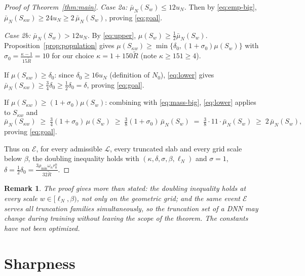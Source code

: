 \documentclass[11pt]{article}
\newtheorem{remark}[theorem]{Remark}
\newcommand{\emp}{\bar\mu_N}
\begin{document}
\begin{proof}[Proof of Theorem~\ref{thm:main}]
\emph{Case 2a: $\emp(S_w)\le12u_N$.}  Then by \eqref{eq:emp-big},
$\emp(S_{\kappa w})\ge24u_N\ge2\,\emp(S_w)$, proving \eqref{eq:goal}.

\emph{Case 2b: $\emp(S_w)>12u_N$.}  By \eqref{eq:upper},
$\mu(S_w)\ge\frac12\emp(S_w)$.  Proposition~\ref{prop:population} gives
$\mu(S_{\kappa w})\ge\min\{\delta_0,(1+\sigma_0)\mu(S_w)\}$ with
$\sigma_0=\frac{\kappa-1}{15\widetilde R}=10$ for our choice
$\kappa=1+150\widetilde R$ (note $\kappa\ge151\ge4$).

If $\mu(S_{\kappa w})\ge\delta_0$: since $\delta_0\ge16u_N$ (definition of $N_0$),
\eqref{eq:lower} gives
$\emp(S_{\kappa w})\ge\frac34\delta_0\ge\frac12\delta_0=\delta$, proving
\eqref{eq:goal}.

If $\mu(S_{\kappa w})\ge(1+\sigma_0)\mu(S_w)$: combining with
\eqref{eq:mass-big}, \eqref{eq:lower} applies to $S_{\kappa w}$ and
\[
\emp(S_{\kappa w})\;\ge\;\tfrac34(1+\sigma_0)\,\mu(S_w)
\;\ge\;\tfrac38(1+\sigma_0)\,\emp(S_w)
\;=\;\tfrac38\cdot11\cdot\emp(S_w)\;\ge\;2\,\emp(S_w),
\]
proving \eqref{eq:goal}.

Thus on $\mathcal E$, for every admissible $\mathcal L$, every truncated slab and
every grid scale below $\beta$, the doubling inequality holds with
$(\kappa,\delta,\sigma,\beta,\ell_N)$ and $\sigma=1$,
$\delta=\frac12\delta_0=\frac{3\rho_{\min}\omega_nr_0^n}{32\widetilde R}$.
\end{proof}

\begin{remark}
The proof gives more than stated: the doubling inequality holds at \emph{every}
scale $w\in[\ell_N,\beta)$, not only on the geometric grid; and the same event
$\mathcal E$ serves all truncation families simultaneously, so the truncation set of
a DNN may change during training without leaving the scope of the theorem.  The
constants have not been optimized.
\end{remark}

\section{Sharpness}\label{sec:sharp}
\end{document}
